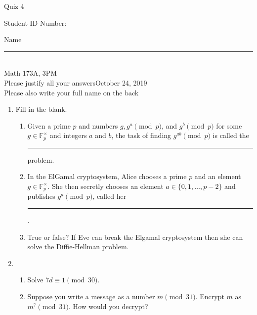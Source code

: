 \documentclass[12pt]{article}
\begin{document}
\begin{flushleft} 
\centerline{\LARGE{Quiz 4}} 
\vspace{5 mm}
{Student ID Number:}\hfill  
{Name \rule {2 in}{0.01in}}\\
Math 173A, 3PM
\\
{Please justify all your answers}\hfill {October 24, 2019}
\\
{Please also write your full name on the back} 

\medskip
\end{flushleft}

\begin{enumerate}
	\item Fill in the blank.
	\begin{enumerate}
		\item Given a prime $p$ and numbers $g, g^a\pmod{p}$, and $g^b\pmod{p}$ for some $g\in \mathbb{F}_p^\times$ and integers $a$ and $b$, the task of finding $g^{ab}\pmod{p}$ is called the \rule{3.5cm}{.15mm} problem.
		\item In the ElGamal cryptosystem, Alice chooses a prime $p$ and an element $g\in \mathbb{F}_p^\times$. She then secretly chooses an element $a\in \{0, 1, \ldots, p-2\}$ and publishes $g^a\pmod{p}$, called her \rule{3.5cm}{.15mm}.
		\item True or false? If Eve can break the Elgamal cryptosystem then she can solve the Diffie-Hellman problem.
	\end{enumerate}
	\item \begin{enumerate}
		\item Solve $7d\equiv 1\pmod{30}$.
		\vfill
		\item Suppose you write a message as a number $m\pmod{31}$. Encrypt $m$ as $m^7\pmod{31}$. How would you decrypt?
		\vfill\null
	\end{enumerate}
\end{enumerate}

\end{document}
